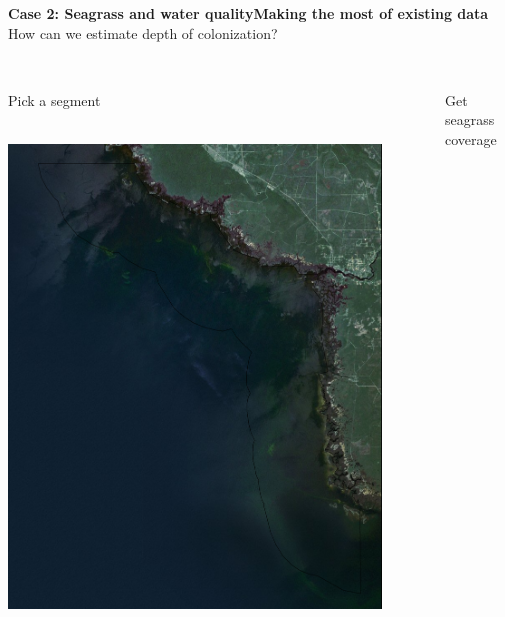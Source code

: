 \documentclass[serif]{beamer}\usepackage[]{graphicx}\usepackage[]{color}
\newenvironment{knitrout}{}{} %
\begin{document}
\begin{frame}{\textbf{Case 2: Seagrass and water quality}}{\textbf{Making the most of existing data}}
\onslide<+->
How can we estimate depth of colonization? \\~\\
\begin{columns}[T]
\onslide<+->
\begin{column}{0.32\textwidth}
Pick a segment\\~\\
\centerline{\includegraphics[width = 0.9\textwidth]{fig/map820.png}}
\end{column}
\onslide<+->
\begin{column}{0.32\textwidth}
Get seagrass coverage
\begin{knitrout}
\color{fgcolor}


\end{knitrout}
\end{column}
\end{columns}
\end{frame}
\end{document}
